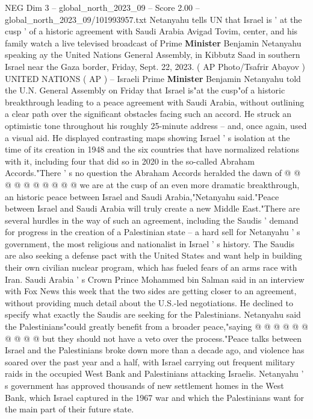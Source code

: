 \begin{textsample}{NEG Dim 3 – global\_north\_2023\_09 – Score 2.00 – global\_north\_2023\_09/101993957.txt}  \label{ex:f3_neg_412}
Netanyahu tells UN that Israel is ' at the cusp ' of a historic agreement with Saudi Arabia Avigad Tovim, center, and his family watch a live televised broadcast of Prime \textbf{Minister} Benjamin Netanyahu speaking ay the United Nations General Assembly, in Kibbutz Saad in southern Israel near the Gaza border, Friday, Sept. 22, 2023. ( AP Photo/Tsafrir Abayov ) UNITED NATIONS ( AP ) -- Israeli Prime \textbf{Minister} Benjamin Netanyahu told the U.N.
General Assembly on Friday that Israel is"at the cusp"of a historic breakthrough leading to a peace agreement with Saudi Arabia, without outlining a clear path over the significant obstacles facing such an accord.
He struck an optimistic tone throughout his roughly 25-minute address -- and, once again, used a visual aid.
He displayed contrasting maps showing Israel ' s isolation at the time of its creation in 1948 and the six countries that have normalized relations with it, including four that did so in 2020 in the so-called Abraham Accords."There ' s no question the Abraham Accords heralded the dawn of @ @ @ @ @ @ @ @ @ @ we are at the cusp of an even more dramatic breakthrough, an historic peace between Israel and Saudi Arabia,"Netanyahu said."Peace between Israel and Saudi Arabia will truly create a new Middle East."There are several hurdles in the way of such an agreement, including the Saudis ' demand for progress in the creation of a Palestinian state -- a hard sell for Netanyahu ' s government, the most religious and nationalist in Israel ' s history.
The Saudis are also seeking a defense pact with the United States and want help in building their own civilian nuclear program, which has fueled fears of an arms race with Iran.
Saudi Arabia ' s Crown Prince Mohammed bin Salman said in an interview with Fox News this week that the two sides are getting closer to an agreement, without providing much detail about the U.S.-led negotiations.
He declined to specify what exactly the Saudis are seeking for the Palestinians.
Netanyahu said the Palestinians"could greatly benefit from a broader peace,"saying @ @ @ @ @ @ @ @ @ @ but they should not have a veto over the process."Peace talks between Israel and the Palestinians broke down more than a decade ago, and violence has soared over the past year and a half, with Israel carrying out frequent military raids in the occupied West Bank and Palestinians attacking Israelis.
Netanyahu ' s government has approved thousands of new settlement homes in the West Bank, which Israel captured in the 1967 war and which the Palestinians want for the main part of their future state.

\end{textsample}
